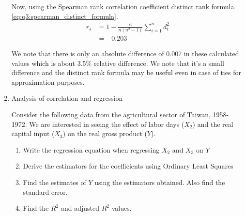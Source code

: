 \documentclass[12pt, oneside]{article}
\begin{document}
\begin{enumerate}
{    Now, using the Spearman rank correlation coefficient distinct rank formula
    \eqref{eq:q3:spearman_distinct_formula}.
    \begin{align*}
        r_s &= 1 - \frac{6}{n(n^2 - 1)} \sum_{i=1}^{n} d_i^2 \\
            &= -0.203
    \end{align*}

    We note that there is only an absolute difference of 0.007 in these calculated
    values which is about 3.5\% relative difference. We note that it's a small
    difference and the distinct rank formula may be useful even in case of ties
    for approximation purposes.
}

\item {
    Analysis of correlation and regression

    Consider the following data from the agricultural sector of Taiwan, 1958-1972.
    We are interested in seeing the effect of labor days (\(X_2\)) and the real capital input (\(X_3\))
    on the real gross product (\(Y\)).

    \begin{enumerate}
        \item Write the regression equation when regressing \(X_2\) and \(X_3\) on \(Y\)
        \item Derive the estimators for the coefficients using Ordinary Least Squares
        \item Find the estimates of \(Y\) using the estimators obtained. Also find the standard error.
        \item Find the \(R^2\) and adjusted-\(R^2\) values.
    \end{enumerate}

}
\end{enumerate}
\end{document}
